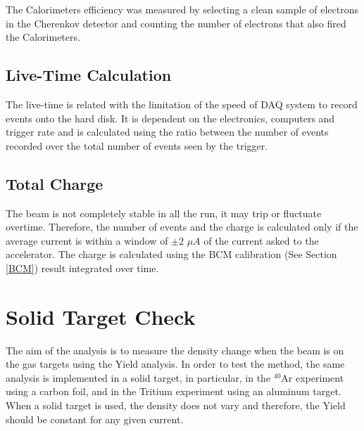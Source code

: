 \documentclass[final,5p,times,twocolumn,balance]{elsarticle}
\begin{document}
The Calorimeters efficiency was measured by selecting a clean sample of electrons in the Cherenkov detector and counting the number of electrons that also fired the Calorimeters.



\subsection{Live-Time Calculation } 

The live-time is related with the limitation of the speed of DAQ system to record events onto the hard disk. It is dependent on the electronics, computers and trigger rate and is calculated using the ratio between the number of events recorded over the total number of events seen by the trigger. 



\subsection{ Total Charge}

The beam is not completely stable in all the run, it may trip or fluctuate overtime. Therefore, the number of events and the charge is calculated only if the average current is within a window of $\pm 2$ $\mu A$ of the current asked to the accelerator.  The charge is calculated using the BCM calibration (See Section \ref{BCM}) result integrated over time.


\section{Solid Target Check}

The aim of the analysis is to measure the density change when the beam is on the gas targets using the Yield analysis. In order to test the method, the same analysis is implemented in a solid target, in particular, in the $^{40}$Ar experiment using a carbon foil, and in the Tritium experiment using an aluminum target. When a solid target is used, the density does not vary and therefore, the Yield should be constant for any given current.
\end{document}
